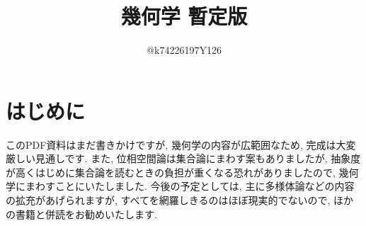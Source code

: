 \documentclass[10pt,a4paper,titlepage]{jsarticle}
\title{幾何学 暫定版}
\author{@k74226197Y126}
\begin{document}
\maketitle
{}
\section*{はじめに}
\par
このPDF資料はまだ書きかけですが, 幾何学の内容が広範囲なため, 完成は大変厳しい見通しです. また, 位相空間論は集合論にまわす案もありましたが, 抽象度が高くはじめに集合論を読むときの負担が重くなる恐れがありましたので, 幾何学にまわすことにいたしました. 今後の予定としては, 主に多様体論などの内容の拡充があげられますが, すべてを網羅しきるのはほぼ現実的でないので, ほかの書籍と併読をお勧めいたします. 
\tableofcontents
\clearpage
{}


\clearpage

\clearpage

\clearpage

\clearpage

\clearpage

\clearpage

\clearpage

\clearpage

\clearpage

\clearpage


\clearpage

\clearpage

\clearpage

\clearpage

\clearpage

\clearpage


\clearpage

\clearpage

\clearpage

\clearpage

\end{document}
